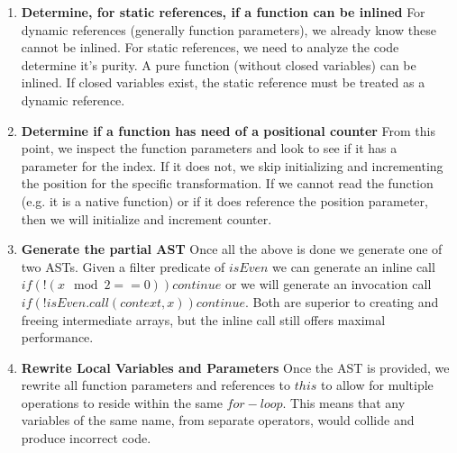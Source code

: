 \begin{enumerate}
  \item \textbf{Determine, for static references, if a function can be inlined}
    For dynamic references (generally  function parameters), we already know these cannot be inlined.  For static references, we need to analyze the code determine it's purity.  A pure function (without closed variables) can be inlined.  If closed variables exist, the static reference must be treated as a dynamic reference.
  \item \textbf{Determine if a function has need of a positional counter}
    From this point, we inspect the function parameters and look to see if it has a parameter for the index.  If it does not, we skip initializing and incrementing the position for the specific transformation.  If we cannot read the function (e.g. it is a native function) or if it does reference the position parameter, then we will initialize and increment counter.
  \item \textbf{Generate the partial AST}
    Once all the above is done we generate one of two ASTs. Given a filter predicate of $isEven$ we can generate an inline call $if (!(x \mod 2 == 0)) continue$ or we will generate an invocation call $if (!isEven.call(context, x)) continue$.  Both are superior to creating and freeing intermediate arrays, but the inline call still offers maximal performance.
  \item \textbf{Rewrite Local Variables and Parameters}
    Once the AST is provided, we rewrite all function parameters and references to $this$ to allow for multiple operations to reside within the same $for-loop$.  This means that any variables of the same name, from separate operators, would collide and produce incorrect code.  
\end{enumerate}